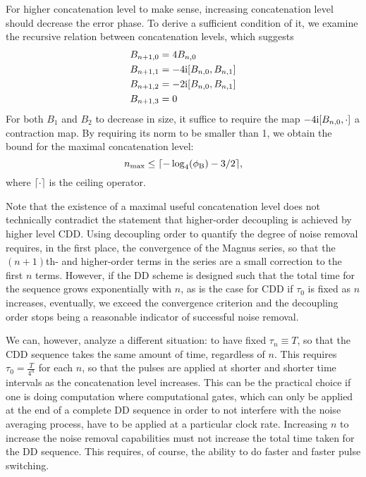 \documentclass[pra,reprint,superscriptaddress]{revtex4-2}
\begin{document}
For higher concatenation level to make sense, increasing concatenation level should decrease the error phase. To derive a sufficient condition of it, we examine the recursive relation between concatenation 
levels, which suggests 
\begin{equation}
\begin{aligned}
 B_{n+1,0} &= 4  B_{n,0}\\
 B_{n+1,1} & = -4\mathrm{i} [B_{n,0}, B_{n,1} ]\\
 B_{n+1,2} & = -2\mathrm{i} [B_{n,0}, B_{n,1} ]\\
  B_{n+1,3} &=0
\end{aligned}
\end{equation}
For both $B_1$ and $B_2$ to decrease in size, it suffice to require the map 
$-4\mathrm{i} [B_{n,0},\cdot]$ a contraction map. 
By requiring its norm to be smaller than 1, we obtain the bound for the maximal concatenation level:
\begin{equation}\label{eq:cdd-max-level}
n_{\max}\le \lceil-\log_4(\phi_{\mathrm{B}})-3/2\rceil,
\end{equation}
where $\lceil\cdot\rceil$ is the ceiling operator.

Note that the existence of a maximal useful concatenation level does not technically contradict the statement that 
higher-order decoupling is achieved by higher level CDD. Using decoupling order to quantify the degree of noise removal requires, in the first place, the convergence of the Magnus series, so that the $(n+1)$th- and higher-order terms in the series are a small correction to the first $n$ terms. However, if the DD scheme is designed such that the total time for the sequence grows exponentially with $n$, as is the case for CDD if $\tau_0$ is fixed as $n$ increases, eventually, we exceed the convergence criterion and the decoupling order stops being a reasonable indicator of successful noise removal. 

We can, however, analyze a different situation: to have fixed $\tau_n\equiv T$, so that the CDD sequence takes the same amount of time, regardless of $n$. This requires $\tau_0=\frac{T}{4^n}$ for each $n$, so that the pulses are applied at shorter and shorter time intervals as the concatenation level increases. This can be the practical choice if one is doing computation where computational gates, which can only be applied at the end of a complete DD sequence in order to not interfere with the noise averaging process, have to be applied at a particular clock rate. Increasing $n$ to increase the noise removal capabilities must not increase the total time taken for the DD sequence. This requires, of course, the ability to do faster and faster pulse switching.
\end{document}
